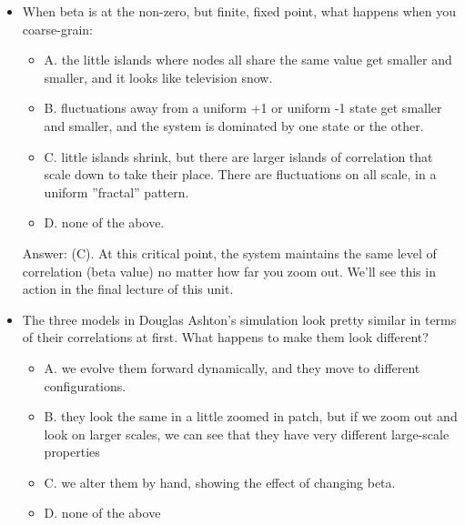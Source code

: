 \documentclass[]{article}
\begin{document}
\begin{itemize}
	\item When beta is at the non-zero, but finite, fixed point, what happens when you coarse-grain:
	
	\begin{itemize}
		\item 	A. the little islands where nodes all share the same value get smaller and smaller, and it looks like television snow.
		
		\item B. fluctuations away from a uniform +1 or uniform -1 state get smaller and smaller, and the system is dominated by one state or the other.
		
		\item C. little islands shrink, but there are larger islands of correlation that scale down to take their place. There are fluctuations on all scale, in a uniform ''fractal'' pattern.
		
		\item D. none of the above.
	\end{itemize}
	
	Answer: (C). At this critical point, the system maintains the same level of correlation (beta value) no matter how far you zoom out. We'll see this in action in the final lecture of this unit.
	

	
	\item The three models in Douglas Ashton's simulation look pretty similar in terms of their correlations at first. What happens to make them look different?
	
	\begin{itemize}
		\item 	A. we evolve them forward dynamically, and they move to different configurations.
		
		\item B. they look the same in a little zoomed in patch, but if we zoom out and look on larger scales, we can see that they have very different large-scale properties
		
		\item C.  we alter them by hand, showing the effect of changing beta.
		
		\item D.  none of the above
	\end{itemize}


\end{itemize}
\end{document}
